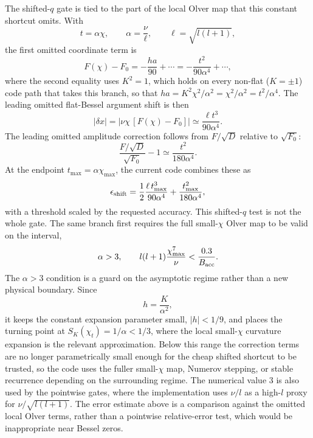 \documentclass[11pt,a4paper]{article}
\newcommand{\SK}{S_K}
\newcommand{\abs}[1]{\left|#1\right|}
\begin{document}
The shifted-\(q\) gate is tied to the part of the local Olver map that this
constant shortcut omits.  With
\begin{equation}
  t=\alpha\chi,\qquad \alpha=\frac{\nu}{\ell},\qquad \ell=\sqrt{l(l+1)},
\end{equation}
the first omitted coordinate term is
\begin{equation}
  F(\chi)-F_0=-\frac{ha}{90}+\cdots
  =-\frac{t^2}{90\alpha^4}+\cdots,
\end{equation}
where the second equality uses \(K^2=1\), which holds on every non-flat
(\(K=\pm1\)) code path that takes this branch, so that
\(ha=K^2\chi^2/\alpha^2=\chi^2/\alpha^2=t^2/\alpha^4\).  The leading omitted
flat-Bessel argument shift is then
\begin{equation}
  \abs{\delta x}
  =\abs{\nu\chi\,[F(\chi)-F_0]}
  \simeq \frac{\ell t^3}{90\alpha^4}.
\end{equation}
The leading omitted amplitude correction follows from
\(F/\sqrt{D}\) relative to \(\sqrt{F_0}\):
\begin{equation}
  \frac{F/\sqrt D}{\sqrt{F_0}}-1
  \simeq \frac{t^2}{180\alpha^4}.
\end{equation}
At the endpoint \(t_{\max}=\alpha\chi_{\max}\), the current code combines these
as
\begin{equation}
  \epsilon_{\rm shift}=
  \frac{1}{2}\frac{\ell\,t_{\max}^3}{90\alpha^4}
  +\frac{t_{\max}^2}{180\alpha^4},
  \label{eq:shift-error}
\end{equation}
with a threshold scaled by the requested accuracy.  This shifted-\(q\) test is
not the whole gate.  The same branch first requires the full small-\(\chi\)
Olver map to be valid on the interval,
\begin{equation}
  \alpha>3,\qquad l(l+1)\frac{\chi_{\max}^7}{\nu}
  <\frac{0.3}{B_{\rm acc}}.
\end{equation}
The \(\alpha>3\) condition is a guard on the asymptotic regime rather than a
new physical boundary.  Since
\begin{equation}
  h=\frac{K}{\alpha^2},
\end{equation}
it keeps the constant expansion parameter small, \(\abs{h}<1/9\), and places
the turning point at \(\SK(\chi_t)=1/\alpha<1/3\), where the local
small-\(\chi\) curvature expansion is the relevant approximation.  Below this
range the correction terms are no longer parametrically small enough for the
cheap shifted shortcut to be trusted, so the code uses the fuller small-\(\chi\)
map, Numerov stepping, or stable recurrence depending on the surrounding
regime.  The numerical value \(3\) is also used by the pointwise gates, where
the implementation uses \(\nu/l\) as a high-\(l\) proxy for
\(\nu/\sqrt{l(l+1)}\).  The error estimate above is a comparison against the
omitted local Olver terms, rather than a pointwise relative-error test, which
would be inappropriate near Bessel zeros.
\end{document}
